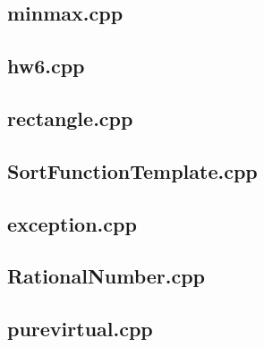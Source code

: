     \subsection{minmax.cpp}
        
    \subsection{hw6.cpp}
        
    \subsection{rectangle.cpp}
        
    \subsection{SortFunctionTemplate.cpp}
        
    \subsection{exception.cpp}
        
    \subsection{RationalNumber.cpp}
        
    \subsection{purevirtual.cpp}
        